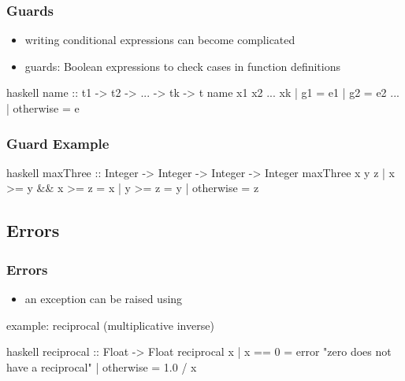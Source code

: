 \documentclass[dvipsnames]{beamer}
\theoremstyle{plain}
\begin{document}
\begin{frame}[fragile]
  \frametitle{Guards}

  \begin{itemize}
    \item writing conditional expressions can become complicated
    \item \alert{guards}: Boolean expressions to check cases
      in function definitions
  \end{itemize}

  \begin{block}{}
    \begin{pygments}{haskell}
name :: t1 -> t2 -> ... -> tk -> t
name x1 x2 ... xk
  | g1        = e1
  | g2        = e2
    ...
  | otherwise = e
    \end{pygments}
  \end{block}
\end{frame}

\begin{frame}[fragile]
  \frametitle{Guard Example}

  \begin{exampleblock}{}
    \begin{pygments}{haskell}
maxThree :: Integer -> Integer -> Integer -> Integer
maxThree x y z
  | x >= y && x >= z = x
  | y >= z           = y
  | otherwise        = z
    \end{pygments}
  \end{exampleblock}
\end{frame}

\subsection{Errors}

\begin{frame}[fragile]
  \frametitle{Errors}

  \begin{itemize}
    \item an exception can be raised using 
  \end{itemize}

  \begin{exampleblock}{example: reciprocal (multiplicative inverse)}
    \begin{pygments}{haskell}
reciprocal :: Float -> Float
reciprocal x
  | x == 0    = error "zero does not have a reciprocal"
  | otherwise = 1.0 / x
    \end{pygments}
  \end{exampleblock}
\end{frame}
\end{document}
